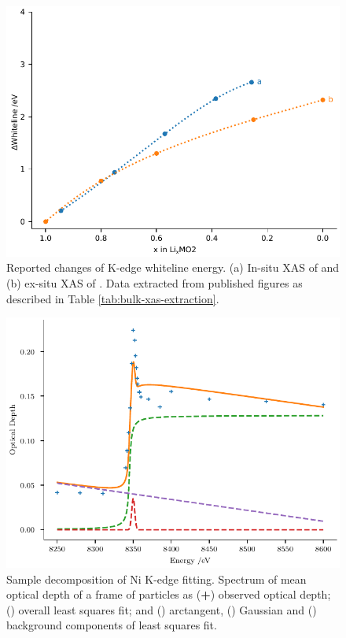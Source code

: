 \documentclass{article}
\begin{document}
\begin{figure}[ht]
  \begin{center}
    \includegraphics{figures/bulk-xas-extraction.pdf}
  \end{center}
  \caption{Reported changes of  K-edge whiteline energy. (a)
    In-situ XAS of  and (b) ex-situ XAS of . Data
    extracted from published figures as described in Table
    \ref{tab:bulk-xas-extraction}.}
  \label{fig:bulk-xas-extraction}
\end{figure}


\begin{figure}
  \begin{center}
    \includegraphics{figures/kedge-decomposition.pdf}
  \end{center}
  \caption{Sample decomposition of Ni K-edge fitting. Spectrum of mean
    optical depth of a frame of \nca{} particles as
    (\textcolor{C0}{\textbf{+}}) observed optical depth;
    (\textcolor{C1}{\mplline{}}) overall least squares fit; and
    (\textcolor{C2}{\mpldashes{}}) arctangent,
    (\textcolor{C3}{\mpldashes{}}) Gaussian and
    (\textcolor{C4}{\mpldashes{}}) background components of least
    squares fit.}
  \label{fig:kedge-decomposition}
\end{figure}
\end{document}
